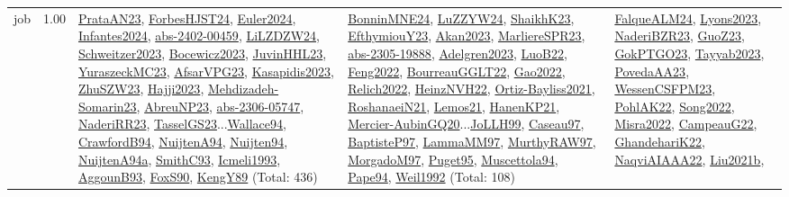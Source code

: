 {\begin{longtable}{p{3cm}r>{\raggedright\arraybackslash}p{6cm}>{\raggedright\arraybackslash}p{6cm}>{\raggedright\arraybackslash}p{8cm}}
\index{job}\index{Scheduling!job}job &  1.00 & \hyperref[detail:PrataAN23]{PrataAN23}, \hyperref[detail:ForbesHJST24]{ForbesHJST24}, \hyperref[detail:Euler2024]{Euler2024}, \hyperref[detail:Infantes2024]{Infantes2024}, \hyperref[detail:abs-2402-00459]{abs-2402-00459}, \hyperref[detail:LiLZDZW24]{LiLZDZW24}, \hyperref[detail:Schweitzer2023]{Schweitzer2023}, \hyperref[detail:Bocewicz2023]{Bocewicz2023}, \hyperref[detail:JuvinHHL23]{JuvinHHL23}, \hyperref[detail:YuraszeckMC23]{YuraszeckMC23}, \hyperref[detail:AfsarVPG23]{AfsarVPG23}, \hyperref[detail:Kasapidis2023]{Kasapidis2023}, \hyperref[detail:ZhuSZW23]{ZhuSZW23}, \hyperref[detail:Hajji2023]{Hajji2023}, \hyperref[detail:Mehdizadeh-Somarin23]{Mehdizadeh-Somarin23}, \hyperref[detail:AbreuNP23]{AbreuNP23}, \hyperref[detail:abs-2306-05747]{abs-2306-05747}, \hyperref[detail:NaderiRR23]{NaderiRR23}, \hyperref[detail:TasselGS23]{TasselGS23}...\hyperref[detail:Wallace94]{Wallace94}, \hyperref[detail:CrawfordB94]{CrawfordB94}, \hyperref[detail:NuijtenA94]{NuijtenA94}, \hyperref[detail:Nuijten94]{Nuijten94}, \hyperref[detail:NuijtenA94a]{NuijtenA94a}, \hyperref[detail:SmithC93]{SmithC93}, \hyperref[detail:Icmeli1993]{Icmeli1993}, \hyperref[detail:AggounB93]{AggounB93}, \hyperref[detail:FoxS90]{FoxS90}, \hyperref[detail:KengY89]{KengY89} (Total: 436) & \hyperref[detail:BonninMNE24]{BonninMNE24}, \hyperref[detail:LuZZYW24]{LuZZYW24}, \hyperref[detail:ShaikhK23]{ShaikhK23}, \hyperref[detail:EfthymiouY23]{EfthymiouY23}, \hyperref[detail:Akan2023]{Akan2023}, \hyperref[detail:MarliereSPR23]{MarliereSPR23}, \hyperref[detail:abs-2305-19888]{abs-2305-19888}, \hyperref[detail:Adelgren2023]{Adelgren2023}, \hyperref[detail:LuoB22]{LuoB22}, \hyperref[detail:Feng2022]{Feng2022}, \hyperref[detail:BourreauGGLT22]{BourreauGGLT22}, \hyperref[detail:Gao2022]{Gao2022}, \hyperref[detail:Relich2022]{Relich2022}, \hyperref[detail:HeinzNVH22]{HeinzNVH22}, \hyperref[detail:Ortiz-Bayliss2021]{Ortiz-Bayliss2021}, \hyperref[detail:RoshanaeiN21]{RoshanaeiN21}, \hyperref[detail:Lemos21]{Lemos21}, \hyperref[detail:HanenKP21]{HanenKP21}, \hyperref[detail:Mercier-AubinGQ20]{Mercier-AubinGQ20}...\hyperref[detail:JoLLH99]{JoLLH99}, \hyperref[detail:Caseau97]{Caseau97}, \hyperref[detail:BaptisteP97]{BaptisteP97}, \hyperref[detail:LammaMM97]{LammaMM97}, \hyperref[detail:MurthyRAW97]{MurthyRAW97}, \hyperref[detail:MorgadoM97]{MorgadoM97}, \hyperref[detail:Puget95]{Puget95}, \hyperref[detail:Muscettola94]{Muscettola94}, \hyperref[detail:Pape94]{Pape94}, \hyperref[detail:Weil1992]{Weil1992} (Total: 108) & \hyperref[detail:FalqueALM24]{FalqueALM24}, \hyperref[detail:Lyons2023]{Lyons2023}, \hyperref[detail:NaderiBZR23]{NaderiBZR23}, \hyperref[detail:GuoZ23]{GuoZ23}, \hyperref[detail:GokPTGO23]{GokPTGO23}, \hyperref[detail:Tayyab2023]{Tayyab2023}, \hyperref[detail:PovedaAA23]{PovedaAA23}, \hyperref[detail:WessenCSFPM23]{WessenCSFPM23}, \hyperref[detail:PohlAK22]{PohlAK22}, \hyperref[detail:Song2022]{Song2022}, \hyperref[detail:Misra2022]{Misra2022}, \hyperref[detail:CampeauG22]{CampeauG22}, \hyperref[detail:GhandehariK22]{GhandehariK22}, \hyperref[detail:NaqviAIAAA22]{NaqviAIAAA22}, \hyperref[detail:Liu2021b]{Liu2021b}, 
\end{longtable}}
